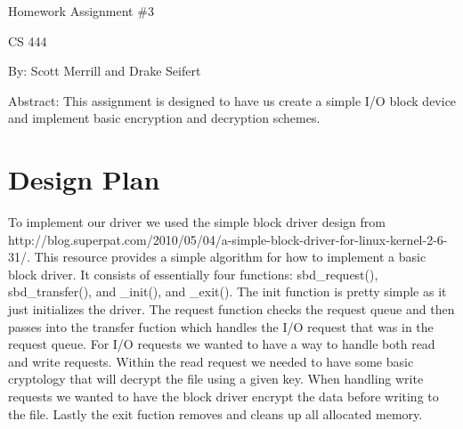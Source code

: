 \documentclass[onecolumn, draftclsnofoot,10pt, compsoc]{IEEEtran}
\def \ClassName {CS 444}
\def \AuthorName {Scott Merrill and Drake Seifert}
\def \DocName {Homework Assignment \#3}
\begin{document}
\begin {titlepage}
    \begin{singlespace}
    	\hfill
        \par\vspace{.2in}
    	\centering
    	\scshape{
    		\huge \DocName \par
            \par\vspace{.2in}
            \large \ClassName \par
            
            \par\vspace{7in}
            \large By: \AuthorName\par
            \par\vspace{.2in}
            \small Abstract: This assignment is designed to have us create a simple I/O block device and implement basic encryption and decryption schemes. 
    	}
    \end{singlespace}
\end{titlepage}


\section{Design Plan}
To implement our driver we used the simple block driver design from http://blog.superpat.com/2010/05/04/a-simple-block-driver-for-linux-kernel-2-6-31/. This resource provides a simple algorithm for how to implement a basic block driver. It consists of essentially four functions: sbd\_request(), sbd\_transfer(), and \_init(), and \_exit(). The init function is pretty simple as it just initializes the driver. The request function checks the request queue and then passes into the transfer fuction which handles the I/O request that was in the request queue. For I/O requests we wanted to have a way to handle both read and write requests. Within the read request we needed to have some basic cryptology that will decrypt the file using a given key. When handling write requests we wanted to have the block driver encrypt the data before writing to the file. Lastly the exit fuction removes and cleans up all allocated memory. 
\end{document}

